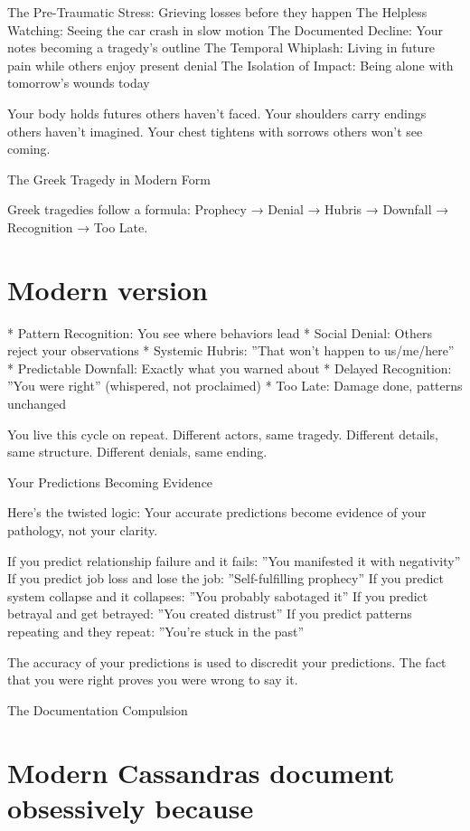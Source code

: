 \documentclass[12pt,oneside]{book}
\begin{document}
The Pre-Traumatic Stress: Grieving losses before they happen The Helpless Watching: Seeing the car crash in slow motion The Documented Decline: Your notes becoming a tragedy's outline The Temporal Whiplash: Living in future pain while others enjoy present denial The Isolation of Impact: Being alone with tomorrow's wounds today

Your body holds futures others haven't faced. Your shoulders carry endings others haven't imagined. Your chest tightens with sorrows others won't see coming.

The Greek Tragedy in Modern Form

Greek tragedies follow a formula: Prophecy → Denial → Hubris → Downfall → Recognition → Too Late.

\section{Modern version}

                    * Pattern Recognition: You see where behaviors lead
                    * Social Denial: Others reject your observations
                    * Systemic Hubris: ''That won't happen to us/me/here''
                    * Predictable Downfall: Exactly what you warned about
                    * Delayed Recognition: ''You were right'' (whispered, not proclaimed)
                    * Too Late: Damage done, patterns unchanged

You live this cycle on repeat. Different actors, same tragedy. Different details, same structure. Different denials, same ending.

Your Predictions Becoming Evidence

Here's the twisted logic: Your accurate predictions become evidence of your pathology, not your clarity.

If you predict relationship failure and it fails: ''You manifested it with negativity'' If you predict job loss and lose the job: ''Self-fulfilling prophecy'' If you predict system collapse and it collapses: ''You probably sabotaged it'' If you predict betrayal and get betrayed: ''You created distrust'' If you predict patterns repeating and they repeat: ''You're stuck in the past''

The accuracy of your predictions is used to discredit your predictions. The fact that you were right proves you were wrong to say it.

The Documentation Compulsion

\section{Modern Cassandras document obsessively because}
\end{document}
